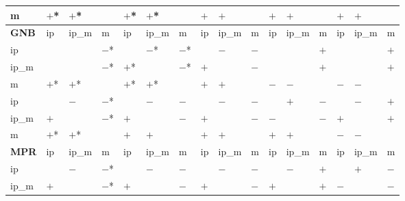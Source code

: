 \begin{table}[htbp]
{\begin{tabular}{l|lll|lll|lll|lll|lll}
m            & $+$*       & $+$*       &            & $+$*       & $+$*       &            & $+$        & $+$        &            & $+$        & $+$        &            & $+$        & $+$        &             \\
\hline
\textbf{GNB} & ip         & ip\_m      & m          & ip         & ip\_m      & m          & ip         & ip\_m      & m          & ip         & ip\_m      & m          & ip         & ip\_m      & m           \\
\hline
ip           &            &            & $-$*       &            & $-$*       & $-$*       &            & $-$        & $-$        &            &            & $+$        &            &            & $+$         \\
ip\_m        &            &            & $-$*       & $+$*       &            & $-$*       & $+$        &            & $-$        &            &            & $+$        &            &            & $+$         \\
m            & $+$*       & $+$*       &            & $+$*       & $+$*       &            & $+$        & $+$        &            & $-$        & $-$        &            & $-$        & $-$        &             \\
\hline
\hline
ip           &            & $-$        & $-$*       &            & $-$        & $-$        &            & $-$        & $-$        &            & $+$        & $-$        &            & $-$        & $+$         \\
ip\_m        & $+$        &            & $-$*       & $+$        &            & $-$        & $+$        &            & $-$        & $-$        &            & $-$        & $+$        &            & $+$         \\
m            & $+$*       & $+$*       &            & $+$        & $+$        &            & $+$        & $+$        &            & $+$        & $+$        &            & $-$        & $-$        &             \\
\hline
\textbf{MPR} & ip         & ip\_m      & m          & ip         & ip\_m      & m          & ip         & ip\_m      & m          & ip         & ip\_m      & m          & ip         & ip\_m      & m           \\
\hline
ip           &            & $-$        & $-$*       &            & $-$        & $-$        &            & $-$        & $-$        &            & $-$        & $+$        &            & $+$        & $-$         \\
ip\_m        & $+$        &            & $-$*       & $+$        &            & $-$        & $+$        &            & $-$        & $+$        &            & $+$        & $-$        &            & $-$         \\

\end{tabular}}
\end{table}
